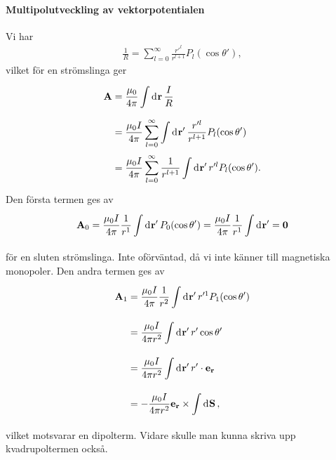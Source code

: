 \paragraph{Multipolutveckling av vektorpotentialen}
Vi har
\begin{align*}
	\frac{1}{R} = \sum\limits_{l = 0}^{\infty}\frac{r'^{l}}{r^{l + 1}}P_{l}(\cos{\theta'}),
\end{align*}
vilket för en strömslinga ger
\begin{align*}
	\vb{A} &= \frac{\mu_{0}}{4\pi}\int\limits_{}^{}\dd[]{\vb{r}}\frac{I}{R} \\
	       &= \frac{\mu_{0}I}{4\pi}\sum\limits_{l = 0}^{\infty}\int\limits_{}^{}\dd[]{\vb{r}'}\frac{r'^{l}}{r^{l + 1}}P_{l}(\cos{\theta'}) \\
	       &= \frac{\mu_{0}I}{4\pi}\sum\limits_{l = 0}^{\infty}\frac{1}{r^{l + 1}}\int\limits_{}^{}\dd[]{\vb{r}'}r'^{l}P_{l}(\cos{\theta'}).
\end{align*}
Den första termen ges av
\begin{align*}
	\vb{A}_{0} = \frac{\mu_{0}I}{4\pi}\frac{1}{r^{1}}\int\limits_{}^{}\dd[]{\vb{r}'}P_{0}(\cos{\theta'}) = \frac{\mu_{0}I}{4\pi}\frac{1}{r^{1}}\int\limits_{}^{}\dd[]{\vb{r}'} = \vb{0}
\end{align*}
för en sluten strömslinga. Inte oförväntad, då vi inte känner till magnetiska monopoler. Den andra termen ges av
\begin{align*}
	\vb{A}_{1} &= \frac{\mu_{0}I}{4\pi}\frac{1}{r^{2}}\int\limits_{}^{}\dd[]{\vb{r}'}r'^{1}P_{1}(\cos{\theta'}) \\
	           &= \frac{\mu_{0}I}{4\pi r^{2}}\int\limits_{}^{}\dd[]{\vb{r}'}r'\cos{\theta'} \\
	           &= \frac{\mu_{0}I}{4\pi r^{2}}\int\limits_{}^{}\dd[]{\vb{r}'}r'\cdot\vb{e}_{\vb{r}} \\
	           &= -\frac{\mu_{0}I}{4\pi r^{2}}\vb{e}_{\vb{r}}\times\int\limits_{}^{}\dd[]{\vb{S}},
\end{align*}
vilket motsvarar en dipolterm. Vidare skulle man kunna skriva upp kvadrupoltermen också.